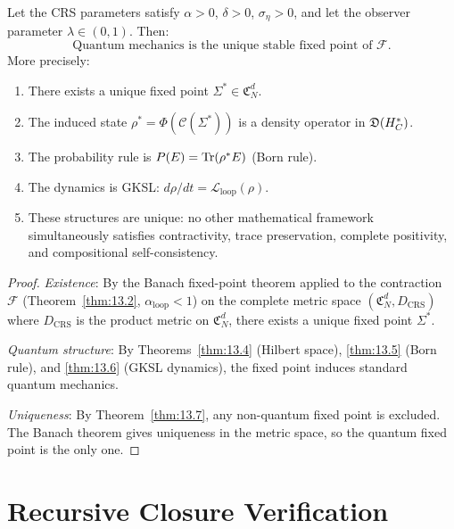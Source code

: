 \begin{theorem}\label{thm:13.8}
Let the CRS parameters satisfy $\alpha > 0$, $\delta > 0$,
$\sigma_\eta > 0$, and let the observer parameter $\lambda \in (0,1)$.
Then:
\begin{equation}\label{eq:unique-fp}
  \boxed{
  \text{Quantum mechanics is the unique stable fixed point of }
  \mathcal{F}.
  }
\end{equation}
More precisely:
\begin{enumerate}
  \item There exists a unique fixed point $\Sigma^* \in \mathfrak{C}_N^d$.
  \item The induced state $\rho^* = \Phi(\mathcal{C}(\Sigma^*))$ is a
    density operator in $\mathfrak{D}(H_C^*)$.
  \item The probability rule is $P(E) = \mathrm{Tr}(\rho^* E)$ (Born rule).
  \item The dynamics is GKSL: $d\rho/dt = \mathcal{L}_{\mathrm{loop}}(\rho)$.
  \item These structures are unique: no other mathematical framework
    simultaneously satisfies contractivity, trace preservation,
    complete positivity, and compositional self-consistency.
\end{enumerate}
\end{theorem}

\begin{proof}
\emph{Existence}: By the Banach fixed-point theorem applied to
the contraction $\mathcal{F}$ (Theorem~\ref{thm:13.2},
$\alpha_{\mathrm{loop}} < 1$) on the complete metric space
$(\mathfrak{C}_N^d, D_{\mathrm{CRS}})$ where $D_{\mathrm{CRS}}$ is the
product metric on $\mathfrak{C}_N^d$, there exists a unique fixed point
$\Sigma^*$.

\emph{Quantum structure}: By Theorems~\ref{thm:13.4} (Hilbert space),
\ref{thm:13.5} (Born rule), and \ref{thm:13.6} (GKSL dynamics), the
fixed point induces standard quantum mechanics.

\emph{Uniqueness}: By Theorem~\ref{thm:13.7}, any non-quantum
fixed point is excluded.  The Banach theorem gives uniqueness in the
metric space, so the quantum fixed point is the only one.
\end{proof}

\section{Recursive Closure Verification}
\label{sec:ch13:closure}


